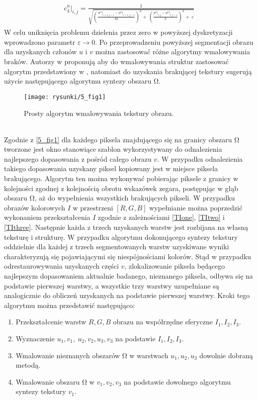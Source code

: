 \documentclass[12pt, twoside, openany]{report}
\theoremstyle{definition}
\begin{document}
\begin{align}
\begin{aligned}
c^n_4\big|_{i,j}=\frac{1}{\sqrt{{\left(\frac{u^n\big|_{i+1,j-1}-u^n\big|_{i-1,j-1}}{2h}\right)}^2+\ {\left(\frac{u^n\big|_{i,j}-u^n\big|_{i,j-1}}{h}\right)}^2+\ \varepsilon }}
\end{aligned}
\end{align}
W celu uniknięcia problemu dzielenia przez zero w powyższej dyskretyzacji wprowadzono parametr $\varepsilon \longrightarrow 0$. 
Po przeprowadzeniu powyższej segmentacji obrazu dla uzyskanych członów $u$ i $v$ można zastosować różne algorytmy wmalowywania braków. Autorzy w \cite{NavierStokesAndTexturePropagation} proponują aby do wmalowywania struktur zastosować algorytm przedstawiony w \cite{bertalmio2000image}, natomiast do uzyskania brakującej tekstury sugerują użycie następującego algorytmu syntezy obszaru $\mathrm{\Omega }$.
\begin{figure}[!h]
	\centering
	\texttt{[image: rysunki/5\_fig1]}
	\caption{Prosty algorytm wmalowywania tekstury obrazu.}
	\label{5_fig1}
\end{figure} \\
Zgodnie z \autoref{5_fig1} dla każdego piksela znajdującego się na granicy obszaru $\mathrm{\Omega }$ tworzone jest okno stanowiące szablon wykorzystywany do odnalezienia najlepszego dopasowania z pośród całego obrazu $v$. W przypadku odnalezienia takiego dopasowania uzyskany piksel kopiowany jest w miejsce piksela brakującego. Algorytm ten można wykonywać pobierając piksele z granicy w kolejności zgodnej z kolejnością obrotu wskazówek zegara, postępując w głąb obszaru $\mathrm{\Omega }$, aż do wypełnienia wszystkich brakujących pikseli. 
W przypadku obrazów kolorowych $I$ w przestrzeni $[R, G, B]$ wypełnianie można poprzedzić wykonaniem przekształcenia $I$ zgodnie z zależnościami \eqref{TIone}, \eqref{TItwo} i \eqref{TIthree}. Następnie każda z trzech uzyskanych warstw jest rozbijana na własną teksturę i strukturę. W przypadku algorytmu dokonującego syntezy tekstury oddzielnie dla każdej z trzech segmentowanych warstw uzyskiwane wyniki charakteryzują się pojawiającymi się niespójnościami kolorów. Stąd w przypadku odrestaurowywania uzyskanych części $v$, zlokalizowanie piksela będącego najlepszym dopasowaniem aktualnie badanego, nieznanego piksela, odbywa się na podstawie pierwszej warstwy, a wszystkie trzy warstwy uzupełniane są analogicznie do obliczeń uzyskanych na podstawie pierwszej warstwy. Kroki tego  algorytmu można przedstawić następująco:
\begin{enumerate}
\item
Przekształcenie warstw $R,G,B$ obrazu na współrzędne sferyczne $I_1,I_2,I_3$.
\item
Wyznaczenie $u_1,v_1,\ u_2,v_2,u_3,v_3$ na podstawie $I_1,I_2,I_3$.
\item
Wmalowanie nieznanych obszarów $\mathrm{\Omega }$ w warstwach $u_1,u_2,u_3$ dowolnie dobraną metodą.
\item
Wmalowanie obszaru $\mathrm{\Omega }$ w $v_1,v_2,v_3$ na podstawie dowolnego algorytmu syntezy tekstury $v_1$.
\end{enumerate}
\end{document}
